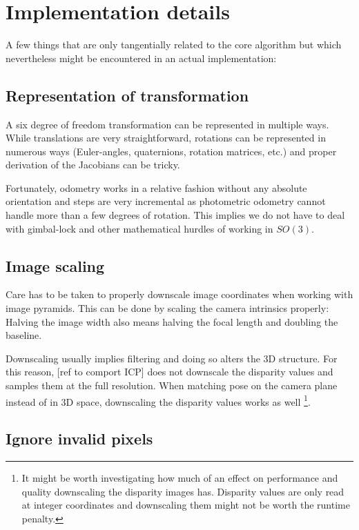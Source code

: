 \chapter{Implementation details}

A few things that are only tangentially related to the core algorithm but which
nevertheless might be encountered in an actual implementation:

\section{Representation of transformation}

A six degree of freedom transformation can be represented in multiple ways.
While translations are very straightforward, rotations can be represented in
numerous ways (Euler-angles, quaternions, rotation matrices, etc.) and proper
derivation of the Jacobians can be tricky.

Fortunately, odometry works in a relative fashion without any absolute
orientation and steps are very incremental as photometric odometry cannot
handle more than a few degrees of rotation. This implies we do not have to deal
with gimbal-lock and other mathematical hurdles of working in $SO(3)$.

\section{Image scaling}

Care has to be taken to properly downscale image coordinates when working with
image pyramids. This can be done by scaling the camera intrinsics properly:
Halving the image width also means halving the focal length and doubling the
baseline.

Downscaling usually implies filtering and doing so alters the 3D structure. For
this reason, [ref to comport ICP] does not downscale the disparity values and
samples them at the full resolution. When matching pose on the camera plane
instead of in 3D space, downscaling the disparity values works as well
\footnote{It might be worth investigating how much of an effect on performance
and quality downscaling the disparity images has. Disparity values are only
read at integer coordinates and downscaling them might not be worth the runtime
penalty.}.

\section{Ignore invalid pixels}

